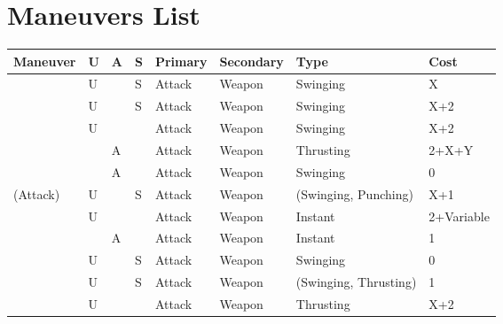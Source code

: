 \documentclass[oneside,11pt,english]{book}
\begin{document}
\section{Maneuvers List}\label{sec:maneuvers-list}
\begin{longtabu} to 
  Maneuver                                         & U & A & S & Primary        & Secondary    & Type                  & Cost                             \\\toprule 
                                 & U &   & S & Attack         & Weapon       & Swinging              & X                                \\
                                & U &   & S & Attack         & Weapon       & Swinging              & X+2                              \\
                          & U &   &   & Attack         & Weapon       & Swinging              & X+2                              \\
                          &   & A &   & Attack         & Weapon       & Thrusting             & 2+X+Y                            \\
                        &   & A &   & Attack         & Weapon       & Swinging              & 0                                \\
   (Attack)                    & U &   & S & Attack         & Weapon       & (Swinging, Punching)  & X+1                              \\
                                & U &   &   & Attack         & Weapon       & Instant               & 2+Variable                       \\
                           &   & A &   & Attack         & Weapon       & Instant               & 1                                \\
                                  & U &   & S & Attack         & Weapon       & Swinging              & 0                                \\
                                 & U &   & S & Attack         & Weapon       & (Swinging, Thrusting) & 1                                \\
                         & U &   &   & Attack         & Weapon       & Thrusting             & X+2                              \\

\end{longtabu}
\end{document}
